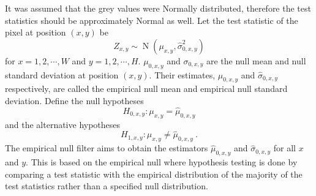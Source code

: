 \documentclass{article}
\DeclareMathOperator{\normal}{N}
\begin{document}
It was assumed that the grey values were Normally distributed, therefore the test statistics should be approximately Normal as well. Let the test statistic of the pixel at position $(x,y)$ be
\begin{equation}
Z_{x,y}\sim\normal(\mu_{x,y},\widehat{\sigma}_{0,x,y}^2)
\end{equation}
for $x=1,2,\cdots,W$ and $y=1,2,\cdots,H$. $\mu_{0,x,y}$ and $\sigma_{0,x,y}$ are the null mean and null standard deviation at position $(x,y)$. Their estimates, $\widehat{\mu}_{0,x,y}$ and $\widehat{\sigma}_{0,x,y}$ respectively, are called the empirical null mean and empirical null standard deviation. Define the null hypotheses
\begin{equation}
  H_{0,x,y}:\mu_{x,y}=\widehat{\mu}_{0,x,y}
\end{equation}
and the alternative hypotheses
\begin{equation}
  H_{1,x,y}:\mu_{x,y}\neq\widehat{\mu}_{0,x,y} \ .
\end{equation}
The empirical null filter aims to obtain the estimators $\widehat{\mu}
_{0,x,y}$ and $\widehat{\sigma}_{0,x,y}$ for all $x$ and $y$. This is based on the empirical null \citep{efron2004large} where hypothesis testing is done by comparing a test statistic with the empirical distribution of the majority of the test statistics rather than a specified null distribution.
\end{document}
